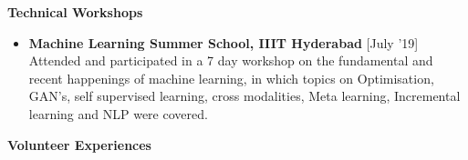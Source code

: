 \documentclass[a4paper,10pt]{article}
\begin{document}
%
%
%

\colorbox{titleColor}{\parbox{6.7in}{\textbf{Technical Workshops}}}

\begin{itemize}
  \setlength{\itemsep}{1pt}
  \item \textbf{Machine Learning Summer School, IIIT Hyderabad}
  \hfill {\small{{[July '19]}}\/} 
  \\
  Attended and participated in a 7 day workshop on the fundamental and recent happenings
  of machine learning, in which topics on Optimisation, GAN's, self supervised learning, cross modalities, Meta learning, Incremental learning and NLP were covered.

\end{itemize}


\colorbox{titleColor}{\parbox{6.7in}{\textbf{Volunteer Experiences}}}
\end{document}
